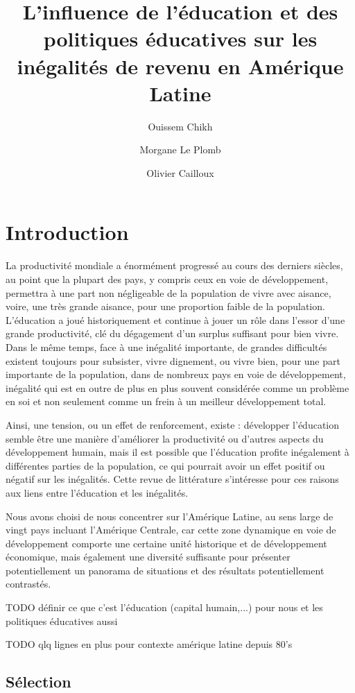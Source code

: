 \documentclass[pagesize, twoside=off, bibliography=totoc, DIV=calc, fontsize=12pt, a4paper, french]{scrartcl}
\title{L’influence de l’éducation et des politiques éducatives sur les inégalités de revenu en Amérique Latine}
\author{Ouissem Chikh}
\author{Morgane Le Plomb}
\author{Olivier Cailloux}
\affil{Université Paris-Dauphine, PSL Research University, CNRS, 75016 PARIS, FRANCE}
\begin{document}
\maketitle
{}
\tableofcontents
\newpage
\setcounter{page}{1}

\section{Introduction}

La productivité mondiale a énormément progressé au cours des derniers siècles, au point que la plupart des pays, y compris ceux en voie de développement, permettra à une part non négligeable de la population de vivre avec aisance, voire, une très grande aisance, pour une proportion faible de la population. L’éducation a joué historiquement et continue à jouer un rôle dans l’essor d’une grande productivité, clé du dégagement d’un surplus suffisant pour bien vivre. Dans le même temps, face à une inégalité importante, de grandes difficultés existent toujours pour subsister, vivre dignement, ou vivre bien, pour une part importante de la population, dans de nombreux pays en voie de développement, inégalité qui est en outre de plus en plus souvent considérée comme un problème en soi et non seulement comme un frein à un meilleur développement total.

Ainsi, une tension, ou un effet de renforcement, existe : développer l’éducation semble être une manière d’améliorer la productivité ou d’autres aspects du développement humain, mais il est possible que l’éducation profite inégalement à différentes parties de la population, ce qui pourrait avoir un effet positif ou négatif sur les inégalités. Cette revue de littérature s’intéresse pour ces raisons aux liens entre l’éducation et les inégalités.

Nous avons choisi de nous concentrer sur l’Amérique Latine, au sens large de vingt pays incluant l’Amérique Centrale, car cette zone dynamique en voie de développement comporte une certaine unité historique et de développement économique, mais également une diversité suffisante pour présenter potentiellement un panorama de situations et des résultats potentiellement contrastés. 

TODO définir ce que c’est l’éducation (capital humain,...) pour nous et les politiques éducatives aussi

TODO qlq lignes en plus pour contexte amérique latine depuis 80’s

\subsection{Sélection}
\end{document}
